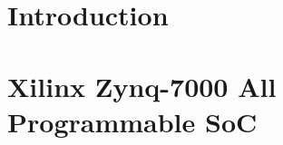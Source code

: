 \section{Introduction}
\label{hardware:Introduction}


\section{Xilinx Zynq-7000 All Programmable SoC}
\label{hardware:zynq}
